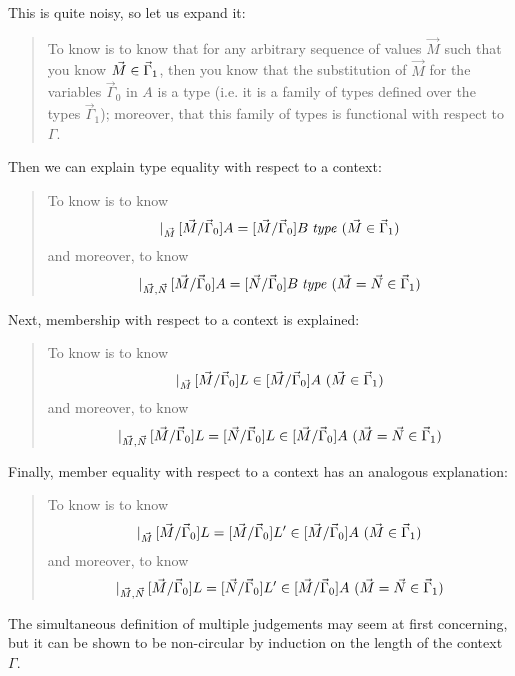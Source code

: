 \documentclass[main.tex]{subfiles}
\begin{document}
This is quite noisy, so let us expand it:

\begin{quote}
  To know  is to know that for any arbitrary sequence
  of values $\vec{M}$ such that you know $\vec{M}\in\vec\Gamma_1$, then
  you know that the substitution of $\vec{M}$ for the variables $\vec\Gamma_0$
  in $A$ is a type (i.e. it is a family of types defined over the types
  $\vec\Gamma_1$); moreover, that this family of types is functional with
  respect to $\Gamma$.
\end{quote}

Then we can explain type equality with respect to a context:

\begin{quote}
  To know  is to know
  \[\lvert_{\vec{M}}\,[\vec{M}/\vec\Gamma_0]A=[\vec{M}/\vec\Gamma_0]B\;\mathit{type}\ (\vec{M}\in\vec\Gamma_1)\]
  and moreover, to know
  \[\lvert_{\vec{M},\vec{N}}\,[\vec{M}/\vec\Gamma_0]A =
  [\vec{N}/\vec\Gamma_0]B\;\mathit{type}\ (\vec{M}=\vec{N}\in\vec\Gamma_1)\]
\end{quote}

Next, membership with respect to a context is explained:

\begin{quote}
  To know  is to know
  \[\lvert_{\vec{M}}\,[\vec{M}/\vec\Gamma_0]L\in[\vec{M}/\vec\Gamma_0]A\ (\vec{M}\in\vec\Gamma_1)\]
  and moreover, to know
  \[\lvert_{\vec{M},\vec{N}}\,[\vec{M}/\vec\Gamma_0]L = [\vec{N}/\vec\Gamma_0]L\in[\vec{M}/\vec\Gamma_0]A\ (\vec{M}=\vec{N}\in\vec\Gamma_1)\]
\end{quote}

Finally, member equality with respect to a context has an analogous explanation:

\begin{quote}
  To know  is to know
  \[\lvert_{\vec{M}}\,[\vec{M}/\vec\Gamma_0]L=[\vec{M}/\vec\Gamma_0]L'\in[\vec{M}/\vec\Gamma_0]A\ (\vec{M}\in\vec\Gamma_1)\]
  and moreover, to know
  \[\lvert_{\vec{M},\vec{N}}\,[\vec{M}/\vec\Gamma_0]L = [\vec{N}/\vec\Gamma_0]L'\in[\vec{M}/\vec\Gamma_0]A\ (\vec{M}=\vec{N}\in\vec\Gamma_1)\]
\end{quote}

The simultaneous definition of multiple judgements may seem at first
concerning, but it can be shown to be non-circular by induction on the length
of the context $\Gamma$.
\end{document}
